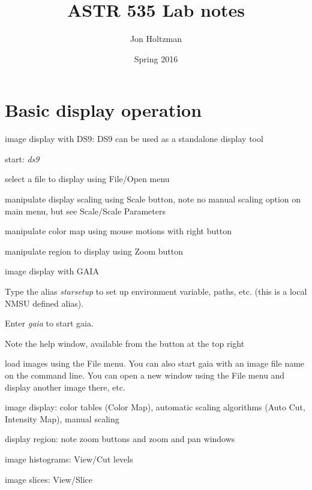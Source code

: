 \documentclass{article}
\title{\vspace{-0.75in}ASTR 535 Lab notes}
\author{Jon Holtzman}
\date{Spring 2016}
\begin{document}
\maketitle

\section*{Basic display operation}
\begin{itemize*}
    \item image display with DS9: DS9 can be used as a standalone display tool
        \begin{itemize*}
            \item start: \emph{ds9}
            \item select a file to display using File/Open menu
            \item manipulate display scaling using Scale button,
                note no manual scaling option on main menu,
                but see Scale/Scale Parameters
            \item manipulate color map using mouse motions with right button
            \item manipulate region to display using Zoom button
        \end{itemize*}
    \item image display with GAIA
        \begin{itemize*}
            \item Type the alias \emph{starsetup} to set up environment variable,
                paths, etc. (this is a local NMSU defined alias).
            \item Enter \emph{gaia} to start gaia.
            \item Note the help window, available from the button at the
                top right
            \item load images using the File menu. You can also start
                gaia with an image file name on the command line. You can open a new window using the
                File menu and display another image there, etc.
            \item image display: color tables (Color Map), automatic scaling
                algorithms (Auto Cut, Intensity Map), manual scaling
            \item display region: note zoom buttons and zoom and pan windows
            \item image histograms: View/Cut levels
            \item image slices: View/Slice
        \end{itemize*}
\end{itemize*}
\end{document}
